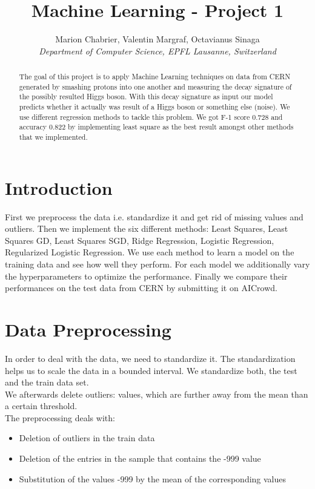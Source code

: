 \documentclass[10pt,conference,compsocconf]{IEEEtran}
\begin{document}
\title{Machine Learning - Project 1}

\author{
  Marion Chabrier, Valentin Margraf, Octavianus Sinaga\\
  \textit{Department of Computer Science, EPFL Lausanne, Switzerland}
}

\maketitle

\begin{abstract}
The goal of this project is to apply Machine Learning techniques on data from CERN generated by smashing protons into one another and measuring the decay signature of the possibly resulted Higgs boson. With this decay signature as input our model predicts whether it actually was result of a Higgs boson or something else (noise). We use different regression methods to tackle this problem. We got F-1 score 0.728 and accuracy 0.822 by implementing least square as the best result amongst other methods that we implemented.
\end{abstract}

\section{Introduction}
First we preprocess the data i.e. standardize it and get rid of missing values and outliers.
Then we implement the six different methods: Least Squares, Least Squares GD, Least Squares SGD, Ridge Regression, Logistic Regression, Regularized Logistic Regression. We use each method to learn a model on the training data and see how well they perform. For each model we additionally vary the hyperparameters to optimize the performance. Finally we compare their performances on the test data from CERN by submitting it on AICrowd.



\section{Data Preprocessing}
\label{sec:prepro}
In order to deal with the data, we need to standardize it. The standardization helps us to scale the data in a bounded interval. We standardize both, the test and the train data set. \\
We afterwards delete outliers: values, which are further away from the mean than a certain threshold. 
\\
The preprocessing deals with:
\begin{itemize}
	\item Deletion of outliers in the train data
	\item Deletion of the entries in the sample that contains the -999 value
	\item Substitution of the values -999 by the mean of the corresponding values 
\end{itemize}
\end{document}
